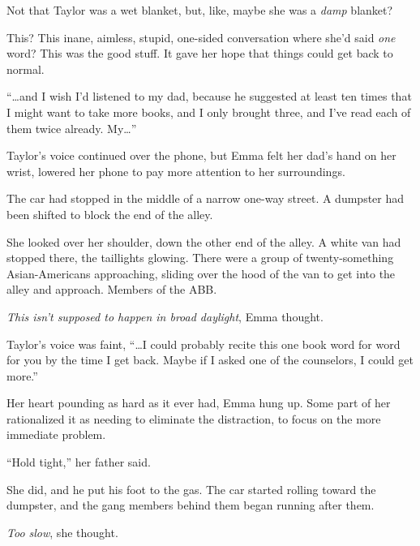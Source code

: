 Not that Taylor was a wet blanket, but, like, maybe she was a \emph{damp} blanket?



This?  This inane, aimless, stupid, one-sided conversation where she'd said\emph{ one} word?  This was the good stuff.  It gave her hope that things could get back to normal.



``\ldots{}and I wish I'd listened to my dad, because he suggested at least ten times that I might want to take more books, and I only brought three, and I've read each of them twice already.  My\ldots''



Taylor's voice continued over the phone, but Emma felt her dad's hand on her wrist, lowered her phone to pay more attention to her surroundings.



The car had stopped in the middle of a narrow one-way street.  A dumpster had been shifted to block the end of the alley.



She looked over her shoulder, down the other end of the alley.  A white van had stopped there, the taillights glowing.  There were a group of twenty-something Asian-Americans approaching, sliding over the hood of the van to get into the alley and approach.  Members of the ABB.



\emph{This isn't supposed to happen in broad daylight}, Emma thought.



Taylor's voice was faint, ``\ldots{}I could probably recite this one book word for word for you by the time I get back.  Maybe if I asked one of the counselors, I could get more.''



Her heart pounding as hard as it ever had, Emma hung up.  Some part of her rationalized it as needing to eliminate the distraction, to focus on the more immediate problem.



``Hold tight,'' her father said.



She did, and he put his foot to the gas.  The car started rolling toward the dumpster, and the gang members behind them began running after them.



\emph{Too slow}, she thought.



